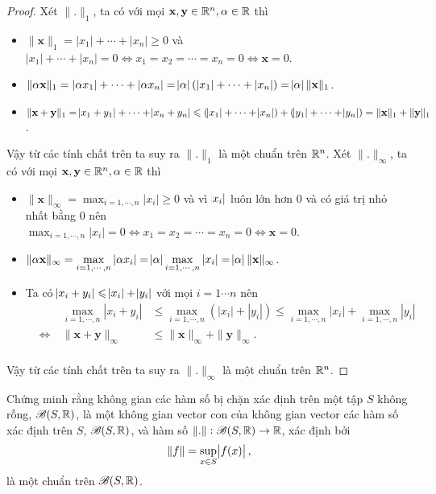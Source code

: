 \begin{proof}
Xét $\|\mathbf{.}\|_1$, ta có với mọi $\mathbf{x}, \mathbf{y} \in \mathbb R^n, \alpha \in \mathbb R$ thì
\begin{itemize}
    \item $\|\mathbf{x}\|_1 = |x_1|+\cdots+|x_n| \geq 0$
        và $|x_1|+\cdots+|x_n| = 0 \Leftrightarrow x_1 = x_2 = \cdots = x_n = 0 \Leftrightarrow \mathbf{x} = 0$.
    \item $\|\mathbf{\alpha x}\|_1 = |\alpha x_1|+\cdots+|\alpha x_n| = \abs{\alpha} (|x_1|+\cdots+|x_n|) = \abs{\alpha} \|\mathbf{x}\|_1$.
    \item $\|\mathbf{x}+\mathbf{y}\|_1 = \abs{x_1 + y_1} + \cdots + \abs{x_n + y_n} \leqslant (\abs{x_1} + \cdots + \abs{x_n}) + (\abs{y_1} + \cdots + \abs{y_n}) = \|\mathbf{x}\|_1+\|\mathbf{y}\|_1$.
\end{itemize}
Vậy từ các tính chất trên ta suy ra $\|\mathbf{.}\|_1$ là một chuẩn trên $\mathbb R^n$.\QEDFill\nll
Xét $\|\mathbf{.}\|_{\infty}$, ta có với mọi $\mathbf{x}, \mathbf{y} \in \mathbb R^n, \alpha \in \mathbb R$ thì
\begin{itemize}
    \item $\|\mathbf{x}\|_{\infty} = \displaystyle\max_{i = 1,\cdots,n} |x_i| \geq 0$
        và vì $\abs{x_i}$ luôn lớn hơn $0$ và có giá trị nhỏ nhất bằng $0$ nên\\$\displaystyle\max_{i = 1,\cdots,n} |x_i| = 0 \Leftrightarrow x_1 = x_2 = \cdots = x_n = 0 \Leftrightarrow \mathbf{x} = 0$.
    \item $\|\mathbf{\alpha x}\|_{\infty} = \displaystyle\max_{i = 1,\cdots,n} |\alpha x_i| = \abs{\alpha}\displaystyle\max_{i = 1,\cdots,n} |x_i| = \abs{\alpha} \|\mathbf{x}\|_{\infty}$.
    \item Ta có $\abs{x_i + y_i} \leqslant \abs{x_i} + \abs{y_i}$ với mọi $i = 1\cdots n$ nên
    \begin{alignat*}{3}
        & & \max_{i = 1,\cdots,n} |x_i + y_i| &\leq \max_{i = 1,\cdots,n} (|x_i| + |y_i|) \leq \max_{i = 1,\cdots,n} |x_i| + \max_{i = 1,\cdots,n} |y_i| \\
        &\Leftrightarrow\ & \|\mathbf{x} + \mathbf{y}\|_{\infty} &\leq \|\mathbf{x}\|_{\infty} + \|\mathbf{y}\|_{\infty}.\\[-1cm]
    \end{alignat*}
\end{itemize}
Vậy từ các tính chất trên ta suy ra $\|\mathbf{.}\|_{\infty}$ là một chuẩn trên $\mathbb R^n$.
\end{proof}

\begin{exercise}{4}
    Chứng minh rằng không gian các hàm số bị chặn xác định trên một tập $S$ không rỗng, $\mathscr{B}(S,\mathbb R)$, là một không gian vector con của không gian vector các hàm số xác định trên $S$, $\mathscr{B}(S,\mathbb R)$, và hàm số $\|.\|: \mathscr{B}(S,\mathbb R) \rightarrow \mathbb R$, xác định bởi
    $$
        \|f\| = \sup_{x \in S} \abs{f(x)},
    $$
    là một chuẩn trên $\mathscr{B}(S,\mathbb R)$.
\end{exercise}

